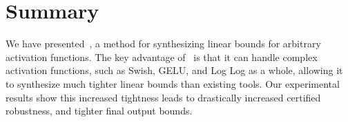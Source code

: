 
%

%



\section{Summary}
\label{onlinesyn:sec:conclusion}

We have presented~\Name{}, a method for synthesizing linear bounds for
arbitrary activation functions.
%
%
The key advantage of~\Name{} is that it can handle complex
activation functions, such as Swish, GELU, and Log Log as a whole, allowing it
to synthesize much tighter linear bounds than existing tools.
%
Our experimental
results show this increased tightness leads to drastically increased certified
robustness, and tighter final output bounds.



